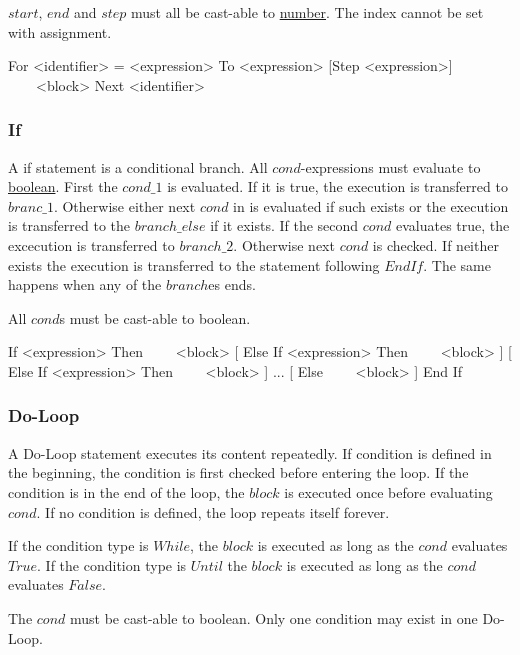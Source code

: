 $start$, $end$ and $step$ must all be cast-able to \hyperref[type:Number]{number}.
The index cannot be set with assignment.

\begin{grammar}%
For <identifier> = <expression> To <expression> [Step <expression>]
~~~~<block>
Next <identifier>
\end{grammar}

\subsubsection{If}
\label{stat:if}
A if statement is a conditional branch.
All $cond$-expressions must evaluate to \hyperref[type:Boolean]{boolean}.
First the $cond\_1$ is evaluated.
If it is true, the execution is transferred to $branc\_1$.
Otherwise either next $cond$ in is evaluated if such exists
or the execution is transferred to the $branch\_else$ if it exists.
If the second $cond$ evaluates true, the excecution is transferred to $branch\_2$.
Otherwise next $cond$ is checked.
If neither exists the execution is transferred to the statement following $End If$.
The same happens when any of the $branch$es ends.

All $cond$s must be cast-able to boolean.

\begin{grammar}%
If <expression> Then
~~~~<block>
[
Else If <expression> Then
~~~~<block>
]
[
Else If <expression> Then
~~~~<block>
]
...
[
Else
~~~~<block>
]
End If
\end{grammar}

\subsubsection{Do-Loop}
\label{stat:do}
A Do-Loop statement executes its content repeatedly.
If condition is defined in the beginning,
the condition is first checked before entering the loop.
If the condition is in the end of the loop,
the $block$ is executed once before evaluating $cond$.
If no condition is defined,
the loop repeats itself forever.

If the condition type is $While$,
the $block$ is executed as long as the $cond$ evaluates $True$.
If the condition type is $Until$
the $block$ is executed as long as the $cond$ evaluates $False$.

The $cond$ must be cast-able to boolean.
Only one condition may exist in one Do-Loop.

